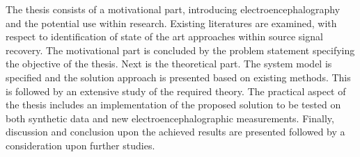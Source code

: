 The thesis consists of a motivational part, introducing electroencephalography and the potential use within research. Existing literatures are examined, with respect to identification of state of the art approaches within source signal recovery. The motivational part is concluded by the problem statement specifying the objective of the thesis.
Next is the theoretical part. The system model is specified and the solution approach is presented based on existing methods. This is followed by an extensive study of the required theory. 
The practical aspect of the thesis includes an implementation of the proposed solution to be tested on both synthetic data and new electroencephalographic measurements. 
Finally, discussion and conclusion upon the achieved results are presented followed by a consideration upon further studies. 
